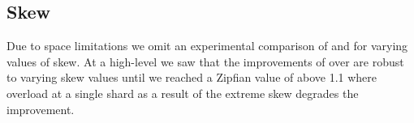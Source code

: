 


\subsection{Skew}
Due to space limitations we omit an experimental comparison of \sys{} and \mpaxos{} for varying values of skew. At a high-level we saw that the improvements of \sys{} over \mpaxos{} are robust to varying skew values until we reached a Zipfian value of above 1.1 where overload at a single shard as a result of the extreme skew degrades the improvement.




